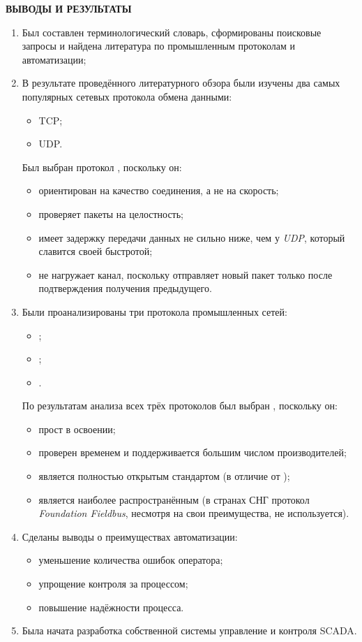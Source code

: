 \begin{center}
	\normalsize\bfseries\MakeUppercase{выводы и результаты}
\end{center}

\begin{enumerate}
	\item Был составлен терминологический словарь, сформированы поисковые запросы и найдена литература по промышленным протоколам и автоматизации;
	\item В результате проведённого литературного обзора были изучены два самых популярных сетевых протокола обмена данными: 
	\begin{itemize}
		\item TCP;
		\item UDP.
	\end{itemize}
Был выбран протокол \tcp, поскольку он:
\begin{itemize}
	\item ориентирован на качество соединения, а не на скорость;
	\item проверяет пакеты на целостность;
	\item имеет задержку передачи данных не сильно ниже, чем у \textit{UDP}, который славится своей быстротой;
	\item не нагружает канал, поскольку отправляет новый пакет только после подтверждения получения предыдущего.
\end{itemize}
	\item Были проанализированы три протокола промышленных сетей: 
	\begin{itemize}
	    \item \mb;
	    \item \pb;
	    \item \ffb.
	\end{itemize}
По результатам анализа всех трёх протоколов был выбран \mb, поскольку он:
\begin{itemize}
	\item прост в освоении;
	\item проверен временем и поддерживается большим числом производителей;
	\item является полностью открытым стандартом (в отличие от \pb);
	\item является наиболее распространённым (в странах СНГ протокол \textit{Foun\-dation Fieldbus}, несмотря на свои преимущества, не используется).
\end{itemize}
	\item Сделаны выводы о преимуществах автоматизации:
	\begin{itemize}
		\item уменьшение количества ошибок оператора;
		\item упрощение контроля за процессом;
		\item повышение надёжности процесса.
	\end{itemize}
	\item Была начата разработка собственной системы управление и контроля \newline SCADA.
\end{enumerate}
\newpage

